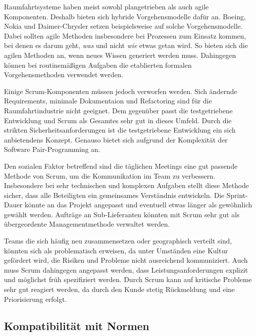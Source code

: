 Raumfahrtsysteme haben meist sowohl plangetrieben als auch agile Komponenten.
Deshalb bieten sich hybride Vorgehensmodelle dafür an.
Boeing, Nokia und Daimer-Chrysler setzen beispielsweise auf solche Vorgehensmodelle.
Dabei sollten agile Methoden insbesondere bei Prozessen zum Einsatz kommen, bei denen es darum geht, \emph{was} und nicht \emph{wie} etwas getan wird.
So bieten sich die agilen Methoden an, wenn neues Wissen generiert werden muss. 
Dahingegen können bei routinemäßigen Aufgaben die etablierten formalen Vorgehensmethoden verwendet werden.

Einige Scrum-Komponenten müssen jedoch verworfen werden.
Sich ändernde Requirements, minimale Dokumentaion und Refactoring sind für die Raumfahrtindustrie nicht geeignet.
Dem gegenüber passt die testgetriebene Entwicklung und Scrum als Gesamtes sehr gut in dieses Umfeld.
Durch die strikten Sicherheitsanforderungen ist die testgetriebene Entwicklung ein sich anbietendens Konzept.
Genauso bietet sich aufgrund der Komplexität der Software Pair-Programming an.

Den sozialen Faktor betreffend sind die täglichen Meetings eine gut passende Methode von Scrum, um die Kommunikation im Team zu verbessern.
Insbesondere bei sehr technischen und komplexen Aufgaben stellt diese Methode sicher, dass alle Beteiligten ein gemeinsames Verständnis entwickeln.
Die Sprint-Dauer könnte an das Projekt angepasst und eventuell etwas länger als gewöhnlich gewählt werden.
Aufträge an Sub-Lieferanten könnten mit Scrum sehr gut als übergeordente Managementmethode verwaltet werden.

Teams die sich häufig neu zusammensetzen oder geographisch verteilt sind, könnten sich als problematisch erweisen, da unter Umständen eine Kultur gefördert wird, die Risiken und Probleme nicht ausreichend kommuniziert.
Auch muss Scrum dahingegen angepasst werden, dass Leistungsanforderungen explizit und möglichst früh spezifiziert werden.
Durch Scrum kann auf kritische Probleme sehr gut reagiert werden, da durch den Kunde stetig Rückmeldung und eine Priorisierung erfolgt.
\parencite[Vgl.][]{Carpenter:2014aa}

\subsection{Kompatibilität mit Normen} %

